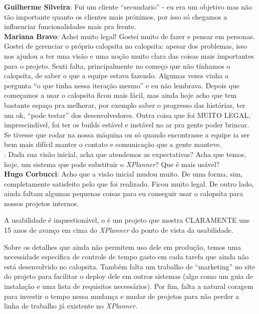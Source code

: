 \textbf{Guilherme Silveira}: Fui um cliente ``secundario'' - eu era um objetivo mas não tão importante quanto os clientes mais próximos, por isso só chegamos a influenciar funcionalidades mais pra frente. \\

\textbf{Mariana Bravo}: Achei muito legal!
Gostei muito de fazer e pensar em personas. Gostei de gerenciar o próprio calopsita no calopsita: apesar dos problemas, isso nos ajudou a ter uma visão e uma noção muito clara das coisas mais importantes para o projeto.
Senti falta, principalmente no começo que não tínhamos o calopsita, de saber o que a equipe estava fazendo. Algumas vezes vinha a pergunta ``o que tinha nessa iteração mesmo'' e eu não lembrava.
Depois que começamos a usar o calopsita ficou mais fácil, mas ainda hoje acho que tem bastante espaço pra melhorar, por exemplo saber o progresso das histórias, ter um ok, ``pode testar'' dos desenvolvedores.
Outra coisa que foi MUITO LEGAL, imprescindível, foi ter os builds estável e instável no ar pra gente poder brincar. Se tivesse que rodar na nossa máquina ou só quando encontrasse a equipe ia ser bem mais difícil manter o contato e comunicação que a gente manteve. \\

\textbf{\calopsita{}}: Dada sua visão inicial, acha que atendemos as expectativas? Acha que temos, hoje, um sistema que pode substituir o \textit{XPlanner}? Que é mais usável?\\

\textbf{Hugo Corbucci}: Acho que a visão inicial mudou muito. De uma forma, sim, completamente satisfeito pelo que foi realizado. Ficou muito legal. De outro lado, ainda faltam algumas pequenas coisas para eu conseguir usar o calopsita para nossos projetos internos.

A usabilidade é inquestionável, o \calopsita{} é um projeto que mostra CLARAMENTE uns 15 anos de avanço em cima do \textit{XPlanner} do ponto de vista da usabilidade.

Sobre os detalhes que ainda não permitem uso dele em produção, temos uma necessidade específica de controle de tempo gasto em cada tarefa que ainda não está desenvolvido no calopsita. Também falta um trabalho de ``marketing'' no site do projeto para facilitar o deploy dele em outros sistemas (algo como um guia de instalação e uma lista de requisitos necessários). Por fim, falta a natural coragem para investir o tempo nessa mudança e mudar de projetos para não perder a linha de trabalho já existente no \textit{XPlanner}.\\

